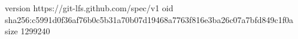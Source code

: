 version https://git-lfs.github.com/spec/v1
oid sha256:c5991d0f36af76b0c5b31a70b07d19468a7763f816e3ba26c07a7bfd849c1f0a
size 1299240
